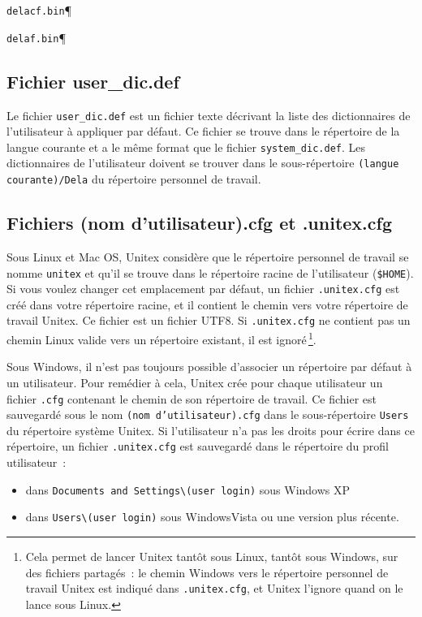 \bigskip
\verb$delacf.bin$\P

\verb$delaf.bin$\P

\subsection{Fichier user\_dic.def}
Le fichier \verb+user_dic.def+ est un fichier texte décrivant la liste des dictionnaires de
l’utilisateur à appliquer par défaut. Ce fichier se trouve dans le répertoire de la langue courante
et a le même format que le fichier \verb+system_dic.def+. 
Les dictionnaires de l’utilisateur doivent se trouver dans le sous-répertoire \verb+(langue courante)/Dela+
du répertoire personnel de travail.


\subsection{Fichiers (nom d’utilisateur).cfg et .unitex.cfg}
Sous Linux et Mac OS, Unitex considère que le répertoire personnel de travail se nomme \verb+unitex+ et
qu’il se trouve dans le répertoire racine de l'utilisateur (\verb+$HOME+). Si vous voulez changer cet emplacement
par défaut, un fichier \verb+.unitex.cfg+ est créé dans votre répertoire racine, et il contient
le chemin vers votre répertoire de travail Unitex. Ce fichier est un fichier UTF8. Si \verb+.unitex.cfg+
ne contient pas un chemin Linux valide vers un répertoire existant, il est ignoré\,\footnote{Cela
permet de lancer Unitex tantôt sous Linux, tantôt sous Windows, sur des fichiers partagés~: le chemin Windows vers le
répertoire personnel de travail Unitex est indiqué dans \texttt{.unitex.cfg}, et Unitex l’ignore quand on le lance
sous Linux.}.


\bigskip
Sous Windows, il n’est pas toujours possible d’associer un répertoire par défaut à un
utilisateur. Pour remédier à cela, Unitex crée pour chaque utilisateur un fichier \verb+.cfg+
contenant le chemin de son répertoire de travail. Ce fichier est sauvegardé sous le nom
\verb+(nom d’utilisateur).cfg+ dans le sous-répertoire \verb+Users+ du
répertoire système Unitex. Si l’utilisateur
n’a pas les droits pour écrire dans ce répertoire, un fichier \verb+.unitex.cfg+ est sauvegardé
dans le répertoire du profil utilisateur~:
\begin{itemize}
\item dans \verb+Documents and Settings\(user login)+ sous Windows XP
\item dans \verb+Users\(user login)+ sous WindowsVista ou une version plus récente.
\end{itemize}


